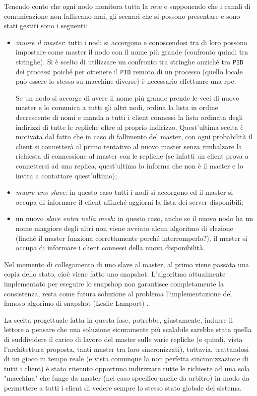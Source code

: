 \documentclass[paper=a4, fontsize=11pt]{scrartcl} %
\numberwithin{equation}{section} %
\numberwithin{figure}{section} %
\numberwithin{table}{section} %
\begin{document}
Tenendo conto che ogni nodo monitora tutta la rete e supponendo che i canali di comunicazione non falliscano mai, gli scenari che si possono presentare e sono stati gestiti sono i seguenti:
\begin{itemize}
\item \textit{muore il master}: tutti i nodi si accorgono e conoscendosi tra di loro possono impostare come master il nodo con il nome più grande (confronto quindi tra stringhe). Si è scelto di utilizzare un confronto tra stringhe anziché tra \texttt{PID} dei processi poiché per ottenere il \texttt{PID} remoto di un processo (quello locale può essere lo stesso su macchine diverse) è necessario effettuare una rpc.

Se un nodo si accorge di avere il nome più grande prende le veci di nuovo master e lo comunica a tutti gli altri nodi, ordina la lista in ordine decrescente di nomi e manda a tutti i client connessi la lista ordinata degli indirizzi di tutte le repliche oltre al proprio indirizzo.
Quest'ultima scelta è motivata dal fatto che in caso di fallimento del master, con ogni probabilità il client si connetterà al primo tentativo al nuovo master senza rimbalzare la richiesta di connessione al master con le repliche (se infatti un client prova a connettersi ad una replica, quest'ultima lo informa che non è il master e lo invita a contattare quest'ultimo);
\item \textit{muore uno slave}: in questo caso tutti i nodi si accorgono ed il master si occupa di informare il client affinché aggiorni la lista dei server disponibili;
\item un nuovo \textit{slave entra nella mesh}: in questo caso, anche se il nuovo nodo ha un nome maggiore degli altri non viene avviato alcun algoritmo di elezione (finché il master funziona correttamente perché interromperlo?), il master si occupa di informare i client connessi della nuova disponibilità.
\end{itemize}

Nel momento di collegamento di uno slave al master, al primo viene passata una copia dello stato, cioè viene fatto uno snapshot. L'algoritmo attualmente implementato
per eseguire lo snapshop non garantisce completamente la consistenza, resta come futura soluzione al problema l'implementazione del famoso algorimo di 
snapshot (Leslie Lamport) \cite{snapshot}.

La scelta progettuale fatta in questa fase, potrebbe, giustamente, indurre il lettore a pensare che una soluzione sicuramente più scalabile sarebbe stata quella di suddividere il carico di lavoro del master sulle varie repliche (e quindi, vista l'architettura proposta, tanti master tra loro sincronizzati), tuttavia, trattandosi di un gioco in tempo reale (e vista comunque la non perfetta sincronizzazione di tutti i client) è stato ritenuto opportuno indirizzare tutte le richieste ad una sola "macchina" che funge da master (nel caso specifico anche da arbitro) in modo da permettere a tutti i client di vedere sempre lo stesso stato globale del sistema.
\end{document}
